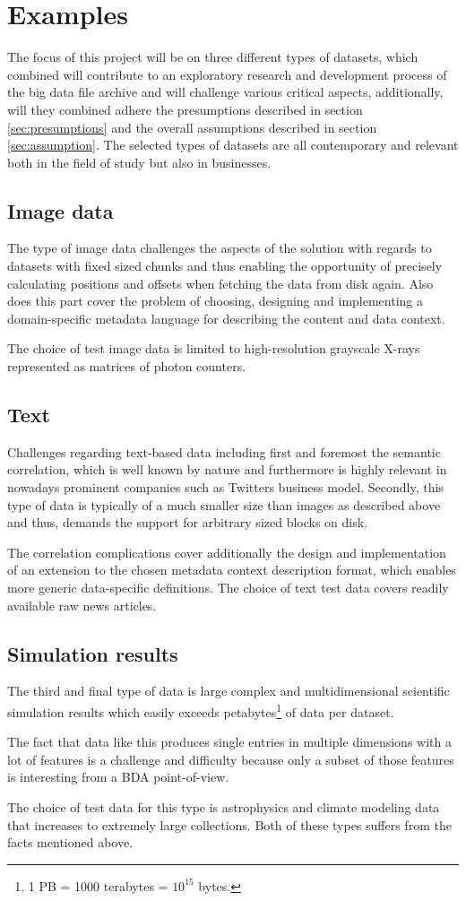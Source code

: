\section{Examples} \label{sec:examples}
The focus of this project will be on three different types of datasets, which combined will contribute to an exploratory research and development process of the big data file archive and will challenge various critical aspects, additionally, will they combined adhere the presumptions described in section \ref{sec:presumptions} and the overall assumptions described in section \ref{sec:assumption}. The selected types of datasets are all contemporary and relevant both in the field of study but also in businesses.

\subsection*{Image data}
The type of image data challenges the aspects of the solution with regards to datasets with fixed sized chunks and thus enabling the opportunity of precisely calculating positions and offsets when fetching the data from disk again. Also does this part cover the problem of choosing, designing and implementing a domain-specific metadata language for describing the content and data context. 

The choice of test image data is limited to high-resolution grayscale X-rays represented as matrices of photon counters.

\subsection*{Text}
Challenges regarding text-based data including first and foremost the semantic correlation, which is well known by nature and furthermore is highly relevant in nowadays prominent companies such as Twitters business model. Secondly, this type of data is typically of a much smaller size than \eg images as described above and thus, demands the support for arbitrary sized blocks on disk. 
\newline

The correlation complications cover additionally the design and implementation of an extension to the chosen metadata context description format, which enables more generic data-specific definitions. The choice of text test data covers \eg readily available raw news articles.

\subsection*{Simulation results}
The third and final type of data is large complex and multidimensional scientific simulation results which easily exceeds petabytes\footnote{1 PB =  1000 terabytes = $10^{15}$ bytes.} of data per dataset. 

The fact that data like this produces single entries in multiple dimensions with a lot of features is a challenge and difficulty because only a subset of those features is interesting from a BDA point-of-view.

The choice of test data for this type is astrophysics and climate modeling data that increases to extremely large collections. Both of these types suffers from the facts mentioned above.